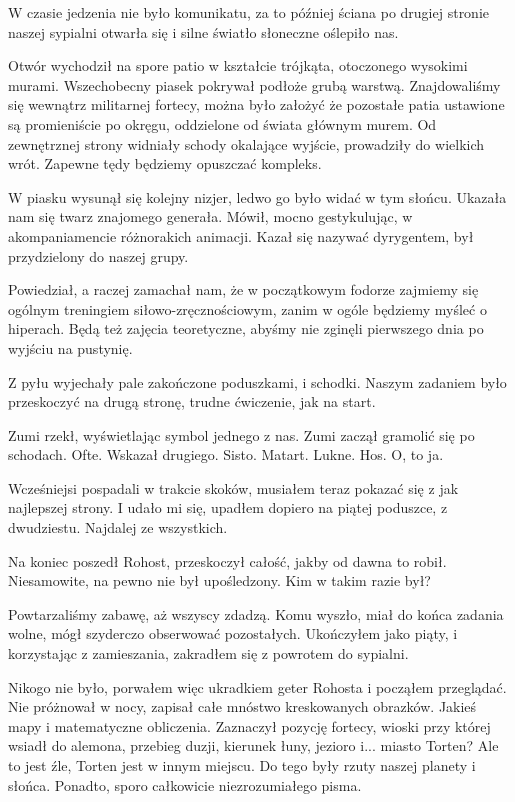 W czasie jedzenia nie było komunikatu, za to później ściana po drugiej stronie naszej sypialni otwarła się i silne światło słoneczne oślepiło nas.

Otwór wychodził na spore patio w kształcie trójkąta, otoczonego wysokimi murami.
Wszechobecny piasek pokrywał podłoże grubą warstwą.
Znajdowaliśmy się wewnątrz militarnej fortecy, można było założyć że pozostałe patia ustawione są promieniście po okręgu, oddzielone od świata głównym murem.
Od zewnętrznej strony widniały schody okalające wyjście, prowadziły do wielkich wrót.
Zapewne tędy będziemy opuszczać kompleks.

W piasku wysunął się kolejny nizjer, ledwo go było widać w tym słońcu.
Ukazała nam się twarz znajomego generała.
Mówił, mocno gestykulując, w akompaniamencie różnorakich animacji.
Kazał się nazywać dyrygentem, był przydzielony do naszej grupy.

Powiedział, a raczej zamachał nam, że w początkowym fodorze zajmiemy się ogólnym treningiem siłowo-zręcznościowym, zanim w ogóle będziemy myśleć o hiperach.
Będą też zajęcia teoretyczne, abyśmy nie zginęli pierwszego dnia po wyjściu na pustynię.

Z pyłu wyjechały pale zakończone poduszkami, i schodki.
Naszym zadaniem było przeskoczyć na drugą stronę, trudne ćwiczenie, jak na start.
\begin{dialogue}
\ds{} Zumi \dm{} rzekł, wyświetlając symbol jednego z nas. Zumi zaczął gramolić się po schodach.
\ds{} Ofte. \dm{} Wskazał drugiego.
\ds{} Sisto.
\ds{} Matart.
\ds{} Lukne.
\ds{} Hos. \dm{} O, to ja.
\end{dialogue}
Wcześniejsi pospadali w trakcie skoków, musiałem teraz pokazać się z jak najlepszej strony.
I udało mi się, upadłem dopiero na piątej poduszce, z dwudziestu.
Najdalej ze wszystkich.

Na koniec poszedł Rohost, przeskoczył całość, jakby od dawna to robił.
Niesamowite, na pewno nie był upośledzony. Kim w takim razie był?

Powtarzaliśmy zabawę, aż wszyscy zdadzą.
Komu wyszło, miał do końca zadania wolne, mógł szyderczo obserwować pozostałych.
Ukończyłem jako piąty, i korzystając z zamieszania, zakradłem się z powrotem do sypialni.

Nikogo nie było, porwałem więc ukradkiem geter Rohosta i począłem przeglądać.
Nie próżnował w nocy, zapisał całe mnóstwo kreskowanych obrazków.
Jakieś mapy i matematyczne obliczenia.
Zaznaczył pozycję fortecy, wioski przy której wsiadł do alemona, przebieg duzji, kierunek łuny, jezioro i... miasto Torten? Ale to jest źle, Torten jest w innym miejscu.
Do tego były rzuty naszej planety i słońca.
Ponadto, sporo całkowicie niezrozumiałego pisma.

